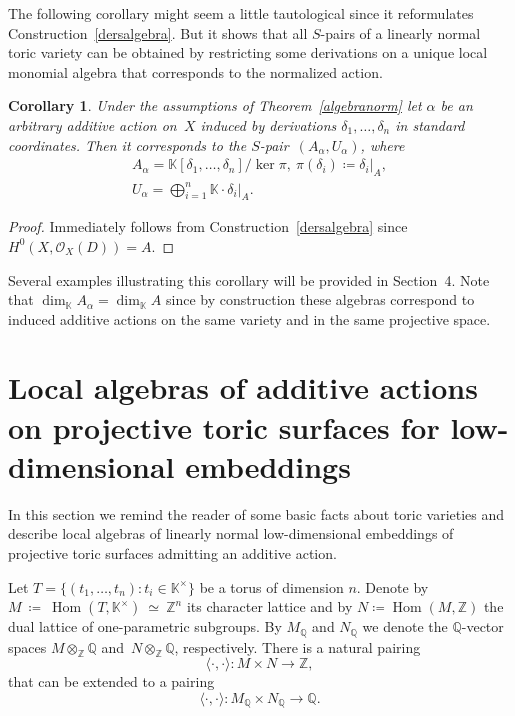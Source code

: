 \documentclass[a4paper,draft,reqno,12pt]{amsart}
\newtheorem{corollary}{Corollary}
\theoremstyle{definition}
\theoremstyle{definition}
\theoremstyle{remark}
\DeclareMathOperator{\homo}{Hom}
\def\BK{{\mathbb K}}
\def\BK{{\mathbb K}}
\def\BZ{{\mathbb Z}}
\def\BQ{{\mathbb Q}}
\def\CO{\mathcal{O}}
\begin{document}
The following corollary might seem a little tautological since it reformulates Construction~\ref{dersalgebra}. But it shows that all $S$-pairs of a linearly normal toric variety can be obtained by restricting some derivations on a unique local monomial algebra that corresponds to the normalized action.

\begin{corollary}\label{secondalgebra}
    Under the assumptions of Theorem~\ref{algebranorm} let $\alpha$ be an arbitrary additive action on~$X$ induced by derivations $\delta_1,\dotsc,\delta_n$ in standard coordinates. Then it corresponds to the $S$-pair~$(A_\alpha,U_\alpha)$, where\begin{gather*}
        A_\alpha= \BK[\delta_1,\dotsc,\delta_n]/\ker\pi, \ \pi(\delta_i)\coloneq\delta_i\Big|_A, \\
        U_\alpha = \bigoplus_{i=1}^n\BK\cdot\delta_i\Big|_A.
    \end{gather*}
\end{corollary}
\begin{proof}
    Immediately follows from Construction~\ref{dersalgebra} since $H^0(X,\CO_X(D)) = A$.
\end{proof}

Several examples illustrating this corollary will be provided in Section~4. Note that $\dim_\BK A_\alpha = \dim_\BK A$ since by construction these algebras correspond to induced additive actions on the same variety and in the same projective space.


\section{Local algebras of additive actions on projective toric surfaces for low-dimensional embeddings}\label{lowdimalgebras}

In this section we remind the reader of some basic facts about toric varieties and describe local algebras of linearly normal low-dimensional embeddings of projective toric surfaces admitting an additive action.

Let $T = \{(t_1,\dotsc,t_n): t_i\in\BK^\times\}$ be a torus of dimension $n$. Denote by $M~\coloneq~\homo(T,\BK^\times)~\simeq~\BZ^n$ its character lattice and by $N \coloneq \homo(M, \BZ)$ the dual lattice of one-parametric subgroups. By $M_\BQ$ and $N_\BQ$ we denote the $\BQ$-vector spaces $M\otimes_\BZ\BQ$ and~$N\otimes_\BZ\BQ$, respectively. There is a natural pairing \begin{equation*}
    \langle\cdot,\cdot\rangle:M\times N \to \BZ,
\end{equation*} that can be extended to a pairing \begin{equation*}
    \langle\cdot,\cdot\rangle:M_\BQ\times N_\BQ \to \BQ.
\end{equation*}
\end{document}
